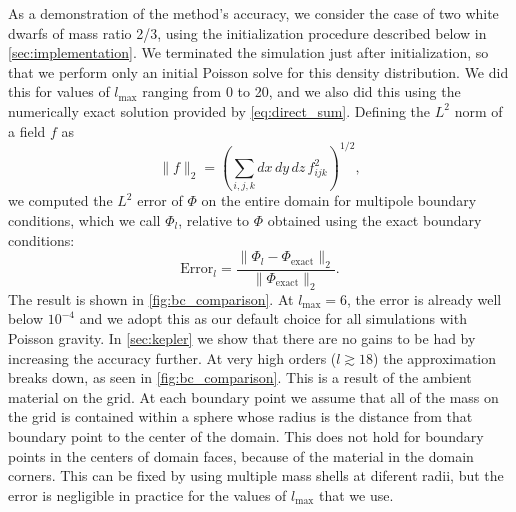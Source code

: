 \documentclass[iop,numberedappendix]{../emulateapj}
\begin{document}
As a demonstration of the method's accuracy, we consider the case of two 
white dwarfs of mass ratio 2/3, using the initialization procedure described below 
in \autoref{sec:implementation}. We terminated the simulation just after
initialization, so that we perform only an initial Poisson solve for this 
density distribution. We did this for values of $l_{\text{max}}$ ranging
from 0 to 20, and we also did this using the numerically exact solution 
provided by \autoref{eq:direct_sum}.  Defining the $L^2$
norm of a field $f$ as
\begin{equation}
  \| f \|_2 = \left(\sum_{i,j,k} dx\, dy\, dz\, f_{ijk}^2\right)^{1/2},
\end{equation}
we computed the $L^2$ error of $\Phi$ on the entire domain for multipole 
boundary conditions, which we call $\Phi_l$, relative to $\Phi$ 
obtained using the exact boundary conditions:
\begin{equation}
  \text{Error}_l = \frac{\|\Phi_l - \Phi_{\text{exact}}\|_2}{\|\Phi_{\text{exact}}\|_2}.
\end{equation}
The result is shown in \autoref{fig:bc_comparison}. At $l_{\text{max}} = 6$,
the error is already well below $10^{-4}$ and we adopt this as our default 
choice for all simulations with Poisson gravity. In \autoref{sec:kepler} we 
show that there are no gains to be had by increasing the accuracy further. At 
very high orders ($l \gtrsim 18$) the approximation breaks down, as seen in \autoref{fig:bc_comparison}. 
This is a result of the ambient material on the grid. At each boundary point we 
assume that all of the mass on the grid is contained within a sphere whose radius is 
the distance from that boundary point to the center of the domain. This does not hold 
for boundary points in the centers of domain faces, because of the material in the 
domain corners. This can be fixed by using multiple mass shells at diferent radii, but the error 
is negligible in practice for the values of $l_{\text{max}}$ that we use.
\end{document}
